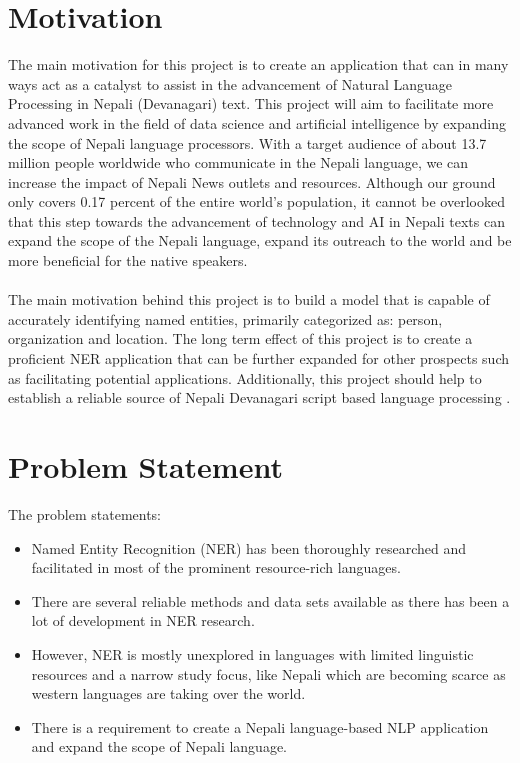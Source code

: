 \section{Motivation}
\vspace{10pt}
The main motivation for this project is to create an application that can in many ways act as a catalyst to assist in the advancement of Natural Language Processing in Nepali (Devanagari) text. This project will aim to facilitate more advanced work in the field of data science and artificial intelligence by expanding the scope of Nepali language processors. With a target audience of about 13.7 million people worldwide who communicate in the Nepali language, we can increase the impact of Nepali News outlets and resources. Although our ground only covers 0.17 percent of the entire world’s population, it cannot be overlooked that this step towards the advancement of technology and AI in Nepali texts can expand the scope of the Nepali language, expand its outreach to the world and be more beneficial for the native speakers.\\
\\
The main motivation behind this project is to build a model that is capable of accurately identifying named entities, primarily categorized as: person, organization and location. The long term effect of this project is to create a proficient NER application that can be further expanded for other prospects such as facilitating potential applications. Additionally, this project should help to establish a reliable source of Nepali Devanagari script based language processing .

\section{Problem Statement}
\vspace{10pt}
 The problem statements:
 \begin{itemize}
  \item Named Entity Recognition (NER) has been thoroughly researched and facilitated in most of the prominent resource-rich languages.
  \item There are several reliable methods and data sets available as 
    there has been a lot of development in NER research.
  \item 	However, NER is mostly unexplored in languages with limited 
    linguistic resources and a narrow study focus, like Nepali which are becoming scarce as western languages are taking over the world.
    \item There is a requirement to create a Nepali language-based NLP 
    application and expand the scope of Nepali language.
\end{itemize}
 
